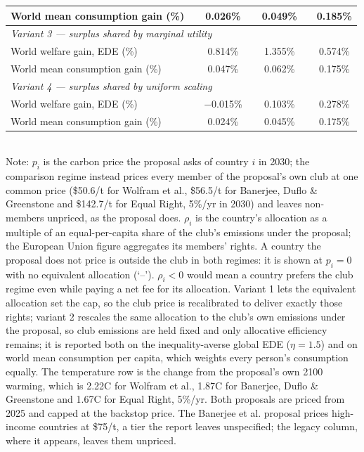 \begin{table}[htbp]
\begin{tabular}{lcccccc}
  \quad World mean consumption gain (\%) &  & 0.026\% &  & 0.049\% &  & 0.185\% \\
  \midrule
  \multicolumn{7}{l}{\textit{Variant 3 --- surplus shared by marginal utility}} \\
  \quad World welfare gain, EDE (\%) &  & 0.814\% &  & 1.355\% &  & 0.574\% \\
  \quad World mean consumption gain (\%) &  & 0.047\% &  & 0.062\% &  & 0.175\% \\
  \midrule
  \multicolumn{7}{l}{\textit{Variant 4 --- surplus shared by uniform scaling}} \\
  \quad World welfare gain, EDE (\%) &  & $-$0.015\% &  & 0.103\% &  & 0.278\% \\
  \quad World mean consumption gain (\%) &  & 0.024\% &  & 0.045\% &  & 0.175\% \\
  \bottomrule
\end{tabular}
\label{tab:equiv_rights_B}
\\[4pt]
{\footnotesize Note: $p_i$ is the carbon price the proposal asks of country $i$ in 2030; the comparison regime instead prices every member of the proposal's own club at one common price (\$50.6/t for Wolfram et al., \$56.5/t for Banerjee, Duflo \& Greenstone and \$142.7/t for Equal Right, 5\%/yr in 2030) and leaves non-members unpriced, as the proposal does. $\rho_i$ is the country's allocation as a multiple of an equal-per-capita share of the club's emissions under the proposal; the European Union figure aggregates its members' rights. A country the proposal does not price is outside the club in both regimes: it is shown at $p_i=0$ with no equivalent allocation (`--'). $\rho_i < 0$ would mean a country prefers the club regime even while paying a net fee for its allocation. Variant 1 lets the equivalent allocation set the cap, so the club price is recalibrated to deliver exactly those rights; variant 2 rescales the same allocation to the club's own emissions under the proposal, so club emissions are held fixed and only allocative efficiency remains; it is reported both on the inequality-averse global EDE ($\eta=1.5$) and on world mean consumption per capita, which weights every person's consumption equally. The temperature row is the change from the proposal's own 2100 warming, which is 2.22\textdegree{}C for Wolfram et al., 1.87\textdegree{}C for Banerjee, Duflo \& Greenstone and 1.67\textdegree{}C for Equal Right, 5\%/yr. Both proposals are priced from 2025 and capped at the backstop price. The Banerjee et al. proposal prices high-income countries at \$75/t, a tier the report leaves unspecified; the legacy column, where it appears, leaves them unpriced.}
\end{table}
